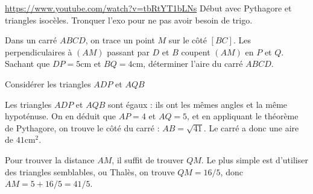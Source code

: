 \begin{exo}
\url{https://www.youtube.com/watch?v=tbRtYT1bLNs}
Début avec Pythagore et triangles isocèles. Tronquer l'exo pour ne pas avoir besoin de trigo.
\end{exo}


\begin{exo}%
Dans un carré $ABCD$, on trace un point $M$ sur le côté $[BC]$.
Les perpendiculaires à $(AM)$ passant par $D$ et $B$ coupent $(AM)$ en $P$ et $Q$.
Sachant que $DP=5$cm et $BQ=4$cm, déterminer l'aire du carré $ABCD$.%
\begin{center}
\end{center}
\begin{hint}
Considérer les triangles $ADP$ et $AQB$
\end{hint}
\begin{sol}
Les triangles $ADP$ et $AQB$ sont égaux : ils ont les mêmes angles et la même hypoténuse.
On en déduit que $AP=4$ et $AQ=5$, et en appliquant le théorème de Pythagore, on trouve le côté du carré : $AB=\sqrt{41}$.
Le carré a donc une aire de $41\mathrm{cm}^2$.

Pour trouver la distance $AM$, il suffit de trouver $QM$. Le plus simple est d'utiliser des triangles semblables, ou Thalès, on trouve $QM=16/5$, donc $AM=5+16/5=41/5$.
\end{sol}
\end{exo}






